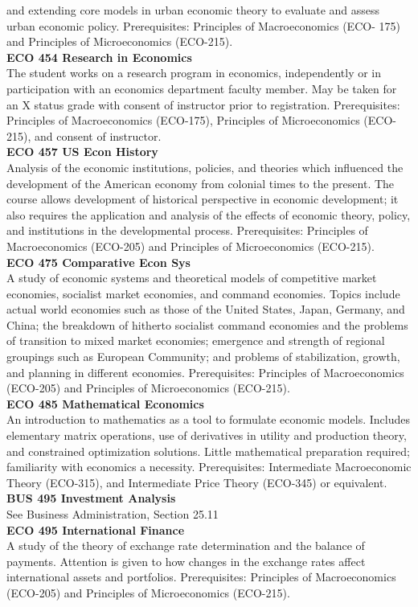 \documentclass[
  letterpaper,
]{scrbook}
\begin{document}
and extending core models in urban economic theory to evaluate and
assess urban economic policy. Prerequisites: Principles of
Macroeconomics (ECO- 175) and Principles of Microeconomics (ECO-215).\\
\textbf{ECO 454 Research in Economics}\\
The student works on a research program in economics, independently or
in participation with an economics department faculty member. May be
taken for an X status grade with consent of instructor prior to
registration. Prerequisites: Principles of Macroeconomics (ECO-175),
Principles of Microeconomics (ECO-215), and consent of instructor.\\
\textbf{ECO 457 US Econ History}\\
Analysis of the economic institutions, policies, and theories which
influenced the development of the American economy from colonial times
to the present. The course allows development of historical perspective
in economic development; it also requires the application and analysis
of the effects of economic theory, policy, and institutions in the
developmental process. Prerequisites: Principles of Macroeconomics
(ECO-205) and Principles of Microeconomics (ECO-215).\\
\textbf{ECO 475 Comparative Econ Sys}\\
A study of economic systems and theoretical models of competitive market
economies, socialist market economies, and command economies. Topics
include actual world economies such as those of the United States,
Japan, Germany, and China; the breakdown of hitherto socialist command
economies and the problems of transition to mixed market economies;
emergence and strength of regional groupings such as European Community;
and problems of stabilization, growth, and planning in different
economies. Prerequisites: Principles of Macroeconomics (ECO-205) and
Principles of Microeconomics (ECO-215).\\
\textbf{ECO 485 Mathematical Economics}\\
An introduction to mathematics as a tool to formulate economic models.
Includes elementary matrix operations, use of derivatives in utility and
production theory, and constrained optimization solutions. Little
mathematical preparation required; familiarity with economics a
necessity. Prerequisites: Intermediate Macroeconomic Theory (ECO-315),
and Intermediate Price Theory (ECO-345) or equivalent.\\
\textbf{BUS 495 Investment Analysis}\\
See Business Administration, Section 25.11\\
\textbf{ECO 495 International Finance}\\
A study of the theory of exchange rate determination and the balance of
payments. Attention is given to how changes in the exchange rates affect
international assets and portfolios. Prerequisites: Principles of
Macroeconomics (ECO-205) and Principles of Microeconomics (ECO-215).
\end{document}
